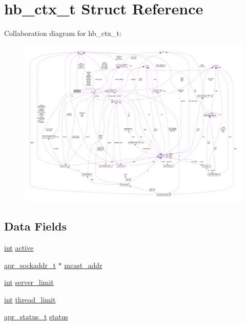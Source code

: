 \hypertarget{structhb__ctx__t}{}\section{hb\+\_\+ctx\+\_\+t Struct Reference}
\label{structhb__ctx__t}


Collaboration diagram for hb\+\_\+ctx\+\_\+t\+:
\nopagebreak
\begin{figure}[H]
\begin{center}
\leavevmode
\includegraphics[width=350pt]{structhb__ctx__t__coll__graph}
\end{center}
\end{figure}
\subsection*{Data Fields}
\begin{DoxyCompactItemize}
\item 
\hyperlink{pcre_8txt_a42dfa4ff673c82d8efe7144098fbc198}{int} \hyperlink{structhb__ctx__t_a40a6bbb01671e0dc8e77e7749f9ed56c}{active}
\item 
\hyperlink{structapr__sockaddr__t}{apr\+\_\+sockaddr\+\_\+t} $\ast$ \hyperlink{structhb__ctx__t_a13d28f445772601c58b1b428d4c9cb8b}{mcast\+\_\+addr}
\item 
\hyperlink{pcre_8txt_a42dfa4ff673c82d8efe7144098fbc198}{int} \hyperlink{structhb__ctx__t_a08b4ffa1fbcfa5eaa91c37404a0659cf}{server\+\_\+limit}
\item 
\hyperlink{pcre_8txt_a42dfa4ff673c82d8efe7144098fbc198}{int} \hyperlink{structhb__ctx__t_ae4722a6dbfece05184e840ff79cca836}{thread\+\_\+limit}
\item 
\hyperlink{group__apr__errno_gaa5105fa83cc322f09382292db8b47593}{apr\+\_\+status\+\_\+t} \hyperlink{structhb__ctx__t_a0e741c95d50f6d53e96ca954d3296304}{status}
\end{DoxyCompactItemize}


